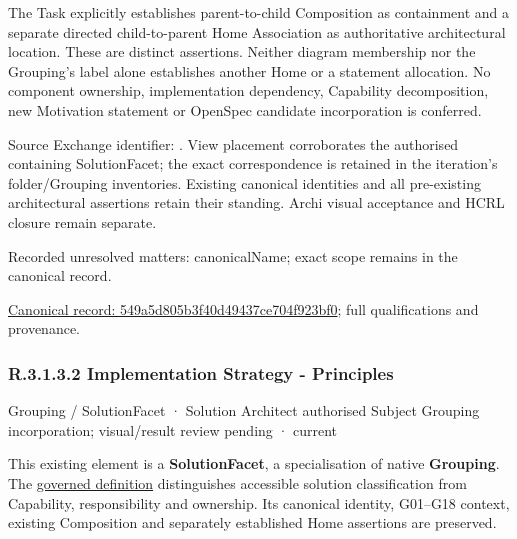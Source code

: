 The Task explicitly establishes parent-to-child Composition as containment and
a separate directed child-to-parent Home Association as authoritative architectural
location. These are distinct assertions. Neither diagram membership nor the
Grouping's label alone establishes another Home or a statement allocation.
No component ownership, implementation dependency, Capability decomposition,
new Motivation statement or OpenSpec candidate incorporation is conferred.



Source Exchange identifier: \texttt{}. View placement corroborates
the authorised containing SolutionFacet; the exact correspondence is retained in the
iteration's folder/Grouping inventories. Existing canonical identities and all
pre-existing architectural assertions retain their standing. Archi visual
acceptance and HCRL closure remain separate.


{\small Recorded unresolved matters: canonicalName; exact scope remains in the canonical record.}\par
{\footnotesize \href{../../../../../../../continuum/grouping/549a5d805b3f40d49437ce704f923bf0.md}{Canonical record: 549a5d805b3f40d49437ce704f923bf0}; full qualifications and provenance.}\par
\subsubsection*{R.3.1.3.2 Implementation Strategy - Principles}
\label{navigation:R.3.1.3.2}

\label{element:93adee1dcb7348dd8bc070e7a53264f6}
{\small Grouping / SolutionFacet · Solution Architect authorised Subject Grouping incorporation; visual/result review pending · current}\par

This existing element is a \textbf{SolutionFacet}, a specialisation of native
\textbf{Grouping}. The \href{\detokenize{../../../../../../../governance/continuum-representation.md#solutionfacet-classification--1119-candidate}}{governed definition}
distinguishes accessible solution classification from Capability, responsibility
and ownership. Its canonical identity, G01–G18 context, existing Composition
and separately established Home assertions are preserved.



